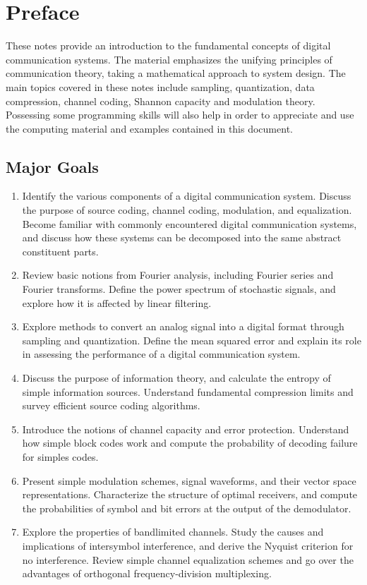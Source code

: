 \chapter{Preface}

These notes provide an introduction to the fundamental concepts of digital communication systems.
The material emphasizes the unifying principles of communication theory, taking a mathematical approach to system design.
The main topics covered in these notes include sampling, quantization, data compression, channel coding, Shannon capacity and modulation theory.
Possessing some programming skills will also help in order to appreciate and use the computing material and examples contained in this document.

\section*{Major Goals}

\begin{enumerate}

\item Identify the various components of a digital communication system.
Discuss the purpose of source coding, channel coding, modulation, and equalization.
Become familiar with commonly encountered digital communication systems, and discuss how these systems can be decomposed into the same abstract constituent parts.
\item Review basic notions from Fourier analysis, including Fourier series and Fourier transforms.
Define the power spectrum of stochastic signals, and explore how it is affected by linear filtering.
\item Explore methods to convert an analog signal into a digital format through sampling and quantization.
Define the mean squared error and explain its role in assessing the performance of a digital communication system.
\item Discuss the purpose of information theory, and calculate the entropy of simple information sources.
Understand fundamental compression limits and survey efficient source coding algorithms.
\item Introduce the notions of channel capacity and error protection.
Understand how simple block codes work and compute the probability of decoding failure for simples codes.
\item Present simple modulation schemes, signal waveforms, and their vector space representations.
Characterize the structure of optimal receivers, and compute the probabilities of symbol and bit errors at the output of the demodulator.
\item Explore the properties of bandlimited channels.
Study the causes and implications of intersymbol interference, and derive the Nyquist criterion for no interference.
Review simple channel equalization schemes and go over the advantages of orthogonal frequency-division multiplexing.

\end{enumerate}

